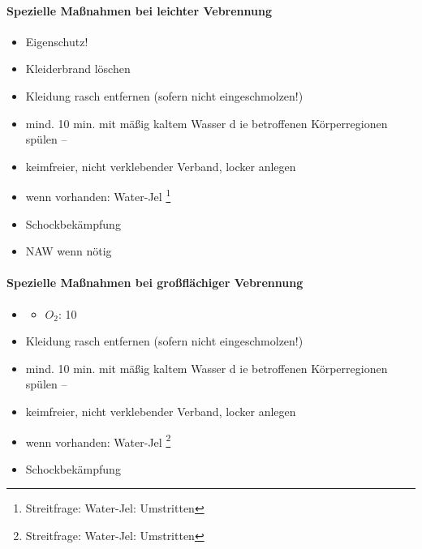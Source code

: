 

\begin{gMassnahmenEnv}
    \paragraph{Spezielle Ma{\ss}nahmen bei leichter
    Vebrennung}
    
    \begin{itemize}
        \item Eigenschutz!
        \item Kleiderbrand l\"oschen
        \item Kleidung rasch entfernen (sofern nicht  eingeschmolzen!)
        \item mind. 10 min. mit m\"a{\ss}ig kaltem Wasser d
       ie betroffenen Körperregionen spülen  --
        \item keimfreier, nicht verklebender Verband, locker anlegen
        \item wenn vorhanden: Water-Jel
        \footnote{Streitfrage: Water-Jel: Umstritten}
        \item Schockbek\"ampfung
        \item NAW wenn n\"otig
    \end{itemize}
\end{gMassnahmenEnv}

\begin{gMassnahmenEnv}
    \paragraph{Spezielle Ma{\ss}nahmen bei großflächiger
    Vebrennung}
    \begin{itemize}
        \item \gTxMassVitBes
        \begin{itemize}
            \item $O_2$: 10\gLMin
        \end{itemize}
        \item Kleidung rasch entfernen (sofern nicht  eingeschmolzen!)
        \item mind. 10 min. mit m\"a{\ss}ig kaltem Wasser d
       ie betroffenen Körperregionen spülen  --
        \item keimfreier, nicht verklebender Verband, locker anlegen
        \item wenn vorhanden: Water-Jel
        \footnote{Streitfrage: Water-Jel: Umstritten}
        \item Schockbek\"ampfung
    \end{itemize}
\end{gMassnahmenEnv}



